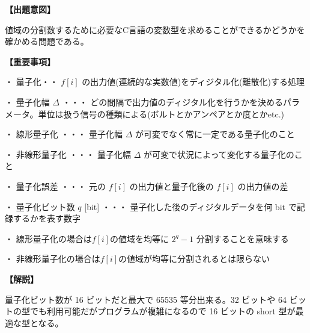 \noindent \textbf{【出題意図】}

\noindent 値域の分割数するために必要なC言語の変数型を求めることができるかどうかを確かめる問題である。

\vspace{1em}
\noindent \textbf{【重要事項】}

\medskip
\noindent ・ 量子化・・ $f[i]$ の出力値(連続的な実数値)をディジタル化(離散化)する処理

\medskip
\noindent ・ 量子化幅 $\Delta$ ・・・ どの間隔で出力値のディジタル化を行うかを決めるパラメータ。単位は扱う信号の種類による(ボルトとかアンペアとか度とかetc.)

\medskip
\noindent ・ 線形量子化 ・・・ 量子化幅  $\Delta$ が可変でなく常に一定である量子化のこと

\medskip
\noindent ・ 非線形量子化 ・・・ 量子化幅  $\Delta$ が可変で状況によって変化する量子化のこと

\medskip
\noindent ・ 量子化誤差 ・・・ 元の $f[i]$ の出力値と量子化後の $f[i]$ の出力値の差

\medskip
\noindent ・ 量子化ビット数 $q$ [bit] ・・・ 量子化した後のディジタルデータを何 bit で記録するかを表す数字

\medskip
\noindent ・ 線形量子化の場合は$f[i]$の値域を均等に $2^q-1$ 分割することを意味する

\medskip
\noindent ・ 非線形量子化の場合は$f[i]$の値域が均等に分割されるとは限らない

\vspace{1em}
\noindent \textbf{【解説】}

\noindent 量子化ビット数が 16 ビットだと最大で 65535 等分出来る。32 ビットや 64 ビットの型でも利用可能だがプログラムが複雑になるので 16 ビットの short 型が最適な型となる。

